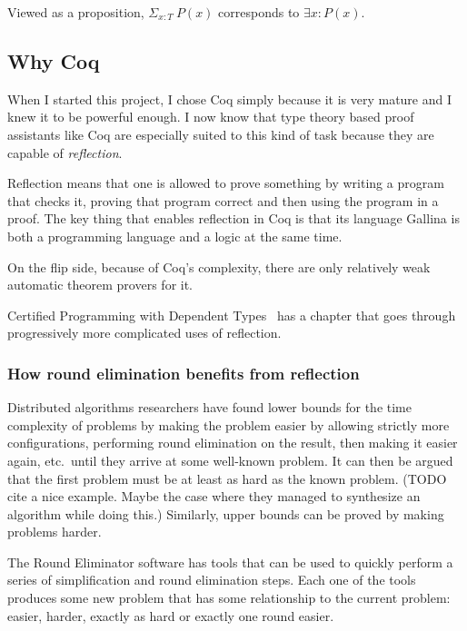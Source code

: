 \documentclass[english, 12pt, a4paper, sci, a-1b, online]{aaltothesis}
\begin{document}
Viewed as a proposition, $\Sigma_{x:T}~P(x)$ corresponds to $\exists x : P(x)$.

\subsection{Why Coq}

When I started this project, I chose Coq simply because it is very mature and I knew it to be powerful enough. I now know that type theory based proof assistants like Coq are especially suited to this kind of task because they are capable of \emph{reflection}.

Reflection means that one is allowed to prove something by writing a program that checks it, proving that program correct and then using the program in a proof. The key thing that enables reflection in Coq is that its language Gallina is both a programming language and a logic at the same time.

On the flip side, because of Coq's complexity, there are only relatively weak automatic theorem provers for it.

Certified Programming with Dependent Types~\cite{CPDT} has a chapter that goes through progressively more complicated uses of reflection.

\subsubsection{How round elimination benefits from reflection}

Distributed algorithms researchers have found lower bounds for the time complexity of problems by making the problem easier by allowing strictly more configurations, performing round elimination on the result, then making it easier again, etc.\ until they arrive at some well-known problem. It can then be argued that the first problem must be at least as hard as the known problem. (TODO cite a nice example. Maybe the case where they managed to synthesize an algorithm while doing this.) Similarly, upper bounds can be proved by making problems harder.

The Round Eliminator software has tools that can be used to quickly perform a series of simplification and round elimination steps. Each one of the tools produces some new problem that has some relationship to the current problem: easier, harder, exactly as hard or exactly one round easier.
\end{document}
